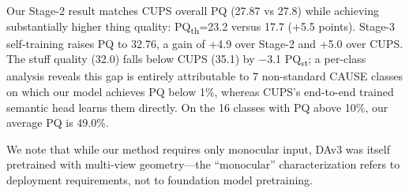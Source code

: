 \documentclass{bmvc2k}
\newcommand{\pqt}{PQ\textsubscript{th}\xspace}
\newcommand{\pqs}{PQ\textsubscript{st}\xspace}
\begin{document}
Our Stage-2 result matches CUPS overall PQ (27.87 vs 27.8) while achieving substantially higher thing quality: \pqt=23.2 versus 17.7 (+5.5 points). Stage-3 self-training raises PQ to 32.76, a gain of +4.9 over Stage-2 and +5.0 over CUPS. The stuff quality (32.0) falls below CUPS (35.1) by $-$3.1 \pqs; a per-class analysis reveals this gap is entirely attributable to 7 non-standard CAUSE classes on which our model achieves PQ below 1\%, whereas CUPS's end-to-end trained semantic head learns them directly. On the 16 classes with PQ above 10\%, our average PQ is 49.0\%.

We note that while our method requires only monocular input, DAv3 was itself pretrained with multi-view geometry---the ``monocular'' characterization refers to deployment requirements, not to foundation model pretraining.
\end{document}
